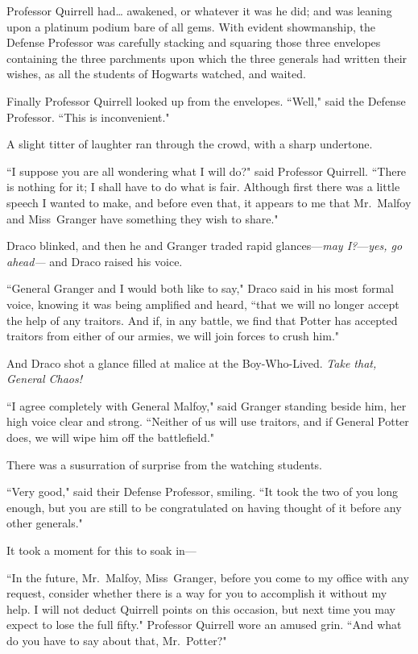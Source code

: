 Professor Quirrell had{\ldots} awakened, or whatever it was he did; and was leaning upon a platinum podium bare of all gems. With evident showmanship, the Defense Professor was carefully stacking and squaring those three envelopes containing the three parchments upon which the three generals had written their wishes, as all the students of Hogwarts watched, and waited.

Finally Professor Quirrell looked up from the envelopes. ``Well," said the Defense Professor. ``This is inconvenient."

A slight titter of laughter ran through the crowd, with a sharp undertone.

``I suppose you are all wondering what I will do?" said Professor Quirrell. ``There is nothing for it; I shall have to do what is fair. Although first there was a little speech I wanted to make, and before even that, it appears to me that Mr.~Malfoy and Miss~Granger have something they wish to share."

Draco blinked, and then he and Granger traded rapid glances—\emph{may I?}—\emph{yes, go ahead—} and Draco raised his voice.

``General Granger and I would both like to say," Draco said in his most formal voice, knowing it was being amplified and heard, ``that we will no longer accept the help of any traitors. And if, in any battle, we find that Potter has accepted traitors from either of our armies, we will join forces to crush him."

And Draco shot a glance filled at malice at the Boy-Who-Lived. \emph{Take that, General Chaos!}

``I agree completely with General Malfoy," said Granger standing beside him, her high voice clear and strong. ``Neither of us will use traitors, and if General Potter does, we will wipe him off the battlefield."

There was a susurration of surprise from the watching students.

``Very good," said their Defense Professor, smiling. ``It took the two of you long enough, but you are still to be congratulated on having thought of it before any other generals."

It took a moment for this to soak in—

``In the future, Mr.~Malfoy, Miss~Granger, before you come to my office with any request, consider whether there is a way for you to accomplish it without my help. I will not deduct Quirrell points on this occasion, but next time you may expect to lose the full fifty." Professor Quirrell wore an amused grin. ``And what do you have to say about that, Mr.~Potter?"

